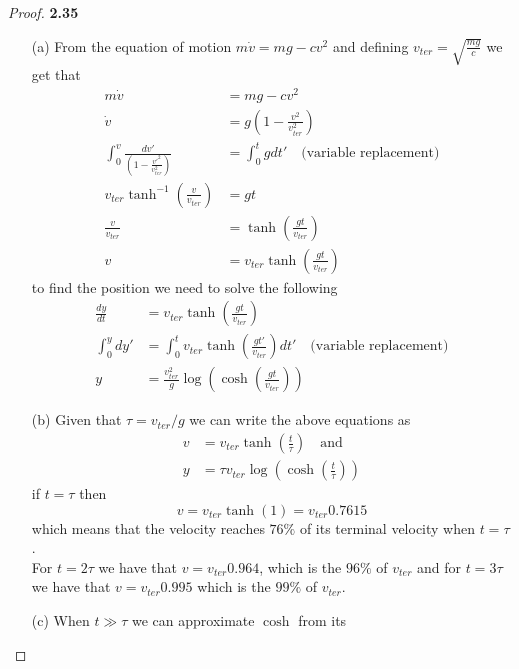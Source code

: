 \documentclass[11pt]{article}
\theoremstyle{definition}
\begin{document}
    \begin{proof}{\textbf{2.35}}
        \begin{itemize}
            \item[(a)] From the equation of motion $m\dot{v} = mg - cv^2$ and
            defining $v_{ter} = \sqrt{\frac{mg}{c}}$ we get that
            \begin{align*}
                m\dot{v} &= mg - cv^2\\
                \dot{v} &= g\left(1 - \frac{v^2}{v_{ter}^2}\right)\\
                \int_0^v\frac{dv'}{\left(1 - \frac{v'^2}{v_{ter}^2}\right)}
                    &= \int_0^tgdt' \quad\text{(variable replacement)}\\
                v_{ter} \tanh^{-1}(\frac{v}{v_{ter}}) &= gt\\
                \frac{v}{v_{ter}} &= \tanh(\frac{gt}{v_{ter}})\\
                v &= v_{ter}\tanh(\frac{gt}{v_{ter}})
            \end{align*}
            to find the position we need to solve the following
            \begin{align*}
                \frac{dy}{dt} &= v_{ter}\tanh(\frac{gt}{v_{ter}})\\
                \int_{0}^y dy' &= \int_0^t v_{ter}\tanh(\frac{gt'}{v_{ter}})dt'
                    \quad\text{(variable replacement)}\\
                y &= \frac{v_{ter}^2}{g} \log(\cosh(\frac{gt}{v_{ter}}))
            \end{align*}
            \item[(b)] Given that $\tau = v_{ter}/g$ we can write the above
            equations as
            \begin{align*}
                v &= v_{ter} \tanh(\frac{t}{\tau}) \quad\text{and}\\
                y &= \tau v_{ter} \log(\cosh(\frac{t}{\tau}))
            \end{align*}
            if $t=\tau$ then
            $$v = v_{ter} \tanh(1) = v_{ter} 0.7615$$
            which means that the velocity reaches $76\%$ of its terminal velocity
            when $t=\tau$.\\
            For $t = 2\tau$ we have that $v = v_{ter}0.964$, which is the $96\%$
            of $v_{ter}$ and for $t = 3\tau$ we have that $v = v_{ter}0.995$
            which is the $99\%$ of $v_{ter}$.
            \item[(c)] When $t \gg \tau$ we can approximate $\cosh$ from its

\end{itemize}
\end{proof}
\end{document}
